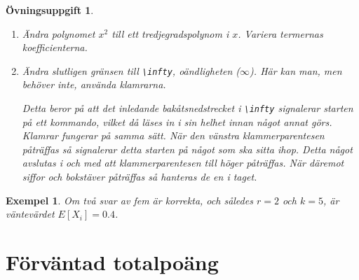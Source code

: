 \documentclass[12pt,a4wide]{article}
\newtheorem{exempel}{Exempel} %
\theoremstyle{uppgiftsstil}
\newcommand{\ovningstext}{Övningsuppgift}
\newtheorem{ovning}{\ovningstext}
\newenvironment{uppgift}{\begin{framed}\begin{ovning}}%
                        {\end{ovning}\end{framed}}
\theoremstyle{avklaradstil}
\begin{document}
\begin{uppgift}
\begin{enumerate}
      Tecknet \verb|^|, ibland kallat ''upphöjttecken'', används för
      såväl exponenter som övre gränser på summor och integraler.  
%
    \item Ändra polynomet $x^2$ till ett tredjegradspolynom i
      $x$. Variera termernas koefficienterna.  
%
    \item Ändra slutligen gränsen till \verb|\infty|, oändligheten
      ($\infty$). Här kan man, men behöver inte, använda
      klamrarna. 

      Detta beror på att det inledande bakåtsnedstrecket i
      \verb|\infty| signalerar starten på ett kommando, vilket då
      läses in i sin helhet innan något annat görs. Klamrar fungerar
      på samma sätt. När den vänstra klammerparentesen påträffas så
      signalerar detta starten på något som ska sitta ihop. Detta
      något avslutas i och med att klammerparentesen till höger
      påträffas. När däremot siffor och bokstäver påträffas så
      hanteras de en i taget.
  \end{enumerate}
\end{uppgift}

\begin{exempel}  
  Om två svar av fem är korrekta, och således $r = 2$
  och $k = 5$, är väntevärdet $E[X_i] = 0.4$.
\end{exempel}

\section{Förväntad totalpoäng}
\label{sec:test}
\end{document}
